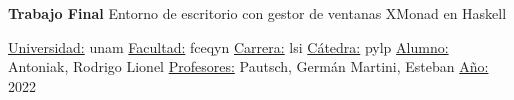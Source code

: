 \begin{center}
	{\fontsize{30pt}{36pt}\selectfont
	\textbf{Trabajo Final}}
	\newline
	\large{Entorno de escritorio con
	gestor de ventanas XMonad en Haskell}
	\newline
\end{center}
\huge{\underline{Universidad:} \acrshort{unam}}
\vspace{36pt}
\newline
\huge{\underline{Facultad:} \acrshort{fceqyn}}
\vspace{36pt}
\newline
\huge{\underline{Carrera:} \acrshort{lsi}}
\vspace{36pt}
\newline
\huge{\underline{Cátedra:} \acrshort{pylp}}
\vspace{36pt}
\newline
\huge{\underline{Alumno:} Antoniak, Rodrigo Lionel}
\vspace{36pt}
\newline
\huge{\underline{Profesores:}}
\newline
\huge{Pautsch, Germán}
\newline
\huge{Martini, Esteban}
\vspace{36pt}
\newline
\huge{\underline{Año:} 2022}
